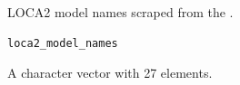 %
\begin{Description}
LOCA2 model names scraped from the
.
\end{Description}
%
\begin{Usage}
\begin{verbatim}
loca2_model_names
\end{verbatim}
\end{Usage}
%
\begin{Format}
%
\begin{SubSection}{}

A character vector with 27 elements.
\end{SubSection}

\end{Format}
